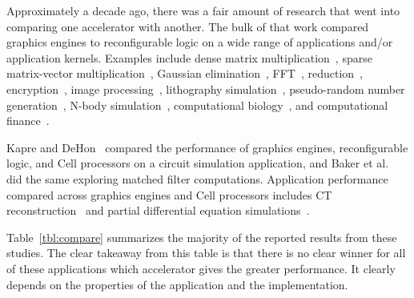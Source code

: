 Approximately a decade ago, there was a fair amount of research that
went into comparing one accelerator with another.  The bulk of that
work compared graphics engines to reconfigurable logic on a wide range
of applications and/or application kernels.
Examples include dense matrix multiplication~\cite{cmhm10,jpbc10},
sparse matrix-vector multiplication~\cite{sww+10},
Gaussian elimination~\cite{cls+08},
FFT~\cite{cmhm10},
reduction~\cite{jpbc10},
encryption~\cite{cls+08},
image processing~\cite{amy09,bnw+10},
lithography simulation~\cite{cz09},
pseudo-random number generation~\cite{jpbc10,tb09,thl09},
N-body simulation~\cite{jpbc10},
computational biology~\cite{cls+08}, and
computational finance~\cite{cmhm10,tb10}.

Kapre and DeHon~\cite{kd09} compared the performance of graphics engines,
reconfigurable logic, and Cell processors on a circuit simulation application,
and Baker et al.~\cite{bgt07} did the same exploring matched filter
computations.
Application performance compared across graphics engines and Cell processors
includes CT reconstruction~\cite{skkh07} and
partial differential equation simulations~\cite{rd10}.

Table~\ref{tbl:compare} summarizes the majority of the
reported results from these studies.
The clear takeaway from this table is that there is no clear winner
for all of these applications which accelerator gives the greater performance.
It clearly depends on the properties of the application and the implementation.


